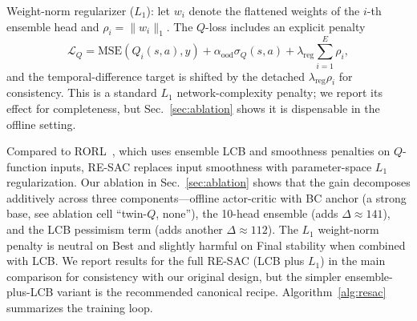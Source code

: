 \documentclass[journal,10pt]{IEEEtran}
\begin{document}
Weight-norm regularizer ($L_1$): let $w_i$ denote the flattened weights of the $i$-th ensemble head and $\rho_i = \|w_i\|_1$. The $Q$-loss includes an explicit penalty
\begin{equation}
    \mathcal{L}_Q = \text{MSE}(Q_i(s,a), y) + \alpha_{\text{ood}} \sigma_Q(s,a) + \lambda_{\text{reg}} \sum_{i=1}^{E} \rho_i,
\end{equation}
and the temporal-difference target is shifted by the detached $\lambda_{\text{reg}}\rho_i$ for consistency. This is a standard $L_1$ network-complexity penalty; we report its effect for completeness, but Sec.~\ref{sec:ablation} shows it is dispensable in the offline setting.

Compared to RORL~\cite{yang2022rorl}, which uses ensemble LCB and smoothness penalties on $Q$-function inputs, RE-SAC replaces input smoothness with parameter-space $L_1$ regularization. Our ablation in Sec.~\ref{sec:ablation} shows that the gain decomposes additively across three components---offline actor-critic with BC anchor (a strong base, see ablation cell ``twin-$Q$, none''), the 10-head ensemble (adds $\Delta\!\approx\!141$), and the LCB pessimism term (adds another $\Delta\!\approx\!112$). The $L_1$ weight-norm penalty is neutral on Best and slightly harmful on Final stability when combined with LCB. We report results for the full RE-SAC (LCB plus $L_1$) in the main comparison for consistency with our original design, but the simpler ensemble-plus-LCB variant is the recommended canonical recipe. Algorithm~\ref{alg:resac} summarizes the training loop.
\end{document}
